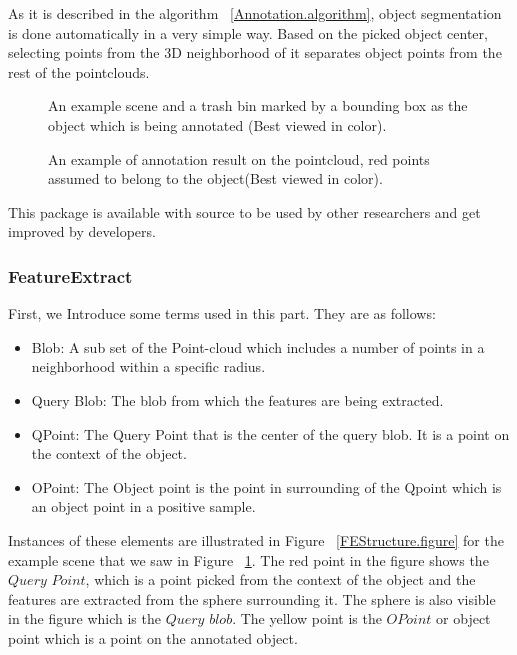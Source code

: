 As it is described in the algorithm ~\ref{Annotation.algorithm}, object segmentation is done automatically in a very 
simple way. Based on the picked object center, selecting points from the 3D neighborhood of it separates object points from the 
rest of the pointclouds.

\begin{figure}[t]
  \caption[Example scene and object for Annotation tool]
  {An example scene and a trash bin marked by a bounding box as the object which is being annotated (Best viewed in color).}
  \label{TrashbinBounding.figure}
\end{figure}

\begin{figure}[t]
  \caption[Annotation tool result]
  {An example of annotation result on the pointcloud, red points assumed to belong to the object(Best viewed in color).}
  \label{Annotation.figure}
\end{figure}

This package is available with source to be used by other researchers and get improved by developers.\cite{AnnotationGithub}


\subsubsection{FeatureExtract}
\label{FeatureExtract.ssec}
First, we Introduce some terms used in this part. They are as follows:
\begin{itemize}
  \item Blob: A sub set of the Point-cloud which includes a number of points in a neighborhood within a specific radius.
  \item Query Blob: The blob from which the features are being extracted.
  \item QPoint: The Query Point that is the center of the query blob. It is a point on the context of the object.
  \item OPoint: The Object point is the point in surrounding of the Qpoint which is an object point in a positive sample.
 \end{itemize}
 
 Instances of these elements are illustrated in Figure ~\ref{FEStructure.figure} for the example scene that we saw in Figure 
 ~\ref{TrashbinBounding.figure}. 
 The red point in the figure shows the $Query$ $Point$, which is a point picked from the context of the object and the features are extracted from the sphere surrounding it. The sphere is also visible in the figure which is the 
$Query$ $blob$. 
 The yellow point is the $OPoint$ or object point which is a point on the annotated object. 
 
